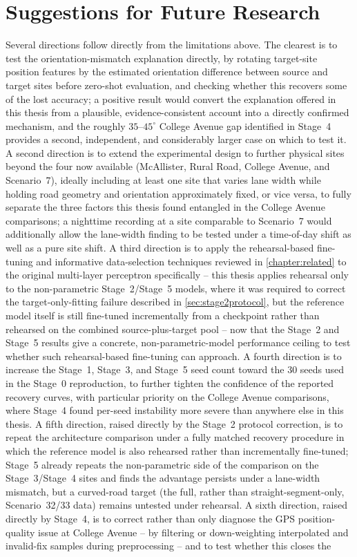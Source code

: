 \documentclass{iutbscthesis}
\begin{document}
\section{Suggestions for Future Research}

Several directions follow directly from the limitations above. The clearest is to test the orientation-mismatch explanation directly, by rotating target-site position features by the estimated orientation difference between source and target sites before zero-shot evaluation, and checking whether this recovers some of the lost accuracy; a positive result would convert the explanation offered in this thesis from a plausible, evidence-consistent account into a directly confirmed mechanism, and the roughly $35$--$45^\circ$ College Avenue gap identified in Stage~4 provides a second, independent, and considerably larger case on which to test it. A second direction is to extend the experimental design to further physical sites beyond the four now available (McAllister, Rural Road, College Avenue, and Scenario~7), ideally including at least one site that varies lane width while holding road geometry and orientation approximately fixed, or vice versa, to fully separate the three factors this thesis found entangled in the College Avenue comparisons; a nighttime recording at a site comparable to Scenario~7 would additionally allow the lane-width finding to be tested under a time-of-day shift as well as a pure site shift. A third direction is to apply the rehearsal-based fine-tuning and informative data-selection techniques reviewed in \autoref{chapter:related} to the original multi-layer perceptron specifically -- this thesis applies rehearsal only to the non-parametric Stage~2/Stage~5 models, where it was required to correct the target-only-fitting failure described in \autoref{sec:stage2protocol}, but the reference model itself is still fine-tuned incrementally from a checkpoint rather than rehearsed on the combined source-plus-target pool -- now that the Stage~2 and Stage~5 results give a concrete, non-parametric-model performance ceiling to test whether such rehearsal-based fine-tuning can approach. A fourth direction is to increase the Stage~1, Stage~3, and Stage~5 seed count toward the 30 seeds used in the Stage~0 reproduction, to further tighten the confidence of the reported recovery curves, with particular priority on the College Avenue comparisons, where Stage~4 found per-seed instability more severe than anywhere else in this thesis. A fifth direction, raised directly by the Stage~2 protocol correction, is to repeat the architecture comparison under a fully matched recovery procedure in which the reference model is also rehearsed rather than incrementally fine-tuned; Stage~5 already repeats the non-parametric side of the comparison on the Stage~3/Stage~4 sites and finds the advantage persists under a lane-width mismatch, but a curved-road target (the full, rather than straight-segment-only, Scenario~32/33 data) remains untested under rehearsal. A sixth direction, raised directly by Stage~4, is to correct rather than only diagnose the GPS position-quality issue at College Avenue -- by filtering or down-weighting interpolated and invalid-fix samples during preprocessing -- and to test whether this closes the 
\end{document}
